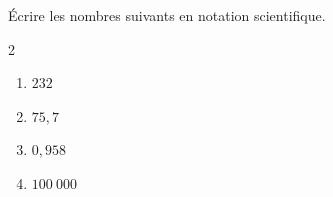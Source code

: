 \begin{exo}{}
	Écrire les nombres suivants en notation scientifique.
	\vspace*{-2mm}\begin{multicols}{2}
		\begin{enumerate}[itemsep=2mm]
			\item $232$
			\item $75,7$
			\item $0,958$
			\item $100\ 000$
		\end{enumerate}
	\end{multicols}
\end{exo}
